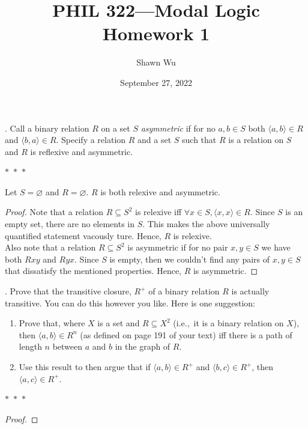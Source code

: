 \documentclass[12pt]{article}
\title{PHIL 322---Modal Logic \\Homework 1}
\author{Shawn Wu}
\date{September 27, 2022}
\begin{document}
\maketitle
. Call a binary relation $R$ on a set $S$ \emph{asymmetric} if for no $a,b \in S$ 
both $\langle a, b \rangle \in R$ and $\langle b, a \rangle \in R$. Specify a 
relation $R$ and a set $S$ such that $R$ is a relation on $S$ and $R$ is reflexive 
and asymmetric.
\begin{center}
    $\ast$~$\ast$~$\ast$
\end{center}
Let $S = \varnothing$ and $R = \varnothing$. $R$ is both relexive and asymmetric.
\begin{proof}
Note that a relation $R \subseteq S^2$ is relexive iff $\forall x \in S, \langle x ,x \rangle \in R.$ 
Since $S$ is an empty set, there are no elements in $S$. This makes the above universally quantified statement vacously ture.
Hence, $R$ is relexive.
\\
Also note that a relation $R \subseteq S^2$ is asymmetric if for no pair $x,y \in S$ we have both $Rxy$ and $Ryx.$
Since $S$ is empty, then we couldn't find any pairs of $x,y \in S$ that dissatisfy the mentioned properties.
Hence, $R$ is asymmetric. 
\end{proof}

\newpage
{}. Prove that the transitive closure, $R^+$ of a binary relation $R$ is actually 
transitive. You can do this however you like. Here is one suggestion:
\begin{enumerate}
\renewcommand{\labelenumi}{\alph{enumi}.}
\item Prove that, where $X$ is a set and $R \subseteq X^2$ (i.e.,\ it is a binary 
relation on $X$), then $\langle a,b \rangle \in R^n$ (as defined on page 191 of 
your text) iff there is a path of length $n$ between $a$ and $b$ in the graph of 
$R$. 
\item Use this result to then argue that if $\langle a,b\rangle \in R^+$ and 
$\langle b,c\rangle \in R^+$, then $\langle a,c\rangle \in R^+$.
\end{enumerate}
\begin{center}
    $\ast$~$\ast$~$\ast$
\end{center}
\begin{proof}
    
\end{proof}
\end{document}
